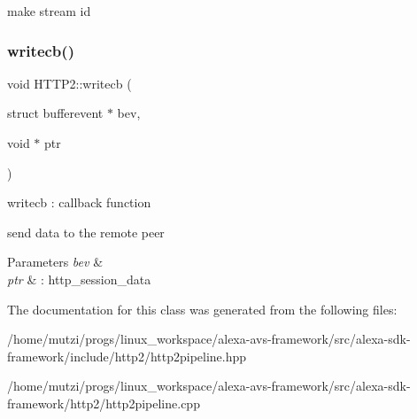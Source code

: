 make stream id \mbox{\label{classhttp2_1_1HTTP2_a5f9d1c3a2216305f7b13164e8f8f734c}} 
\subsubsection{\texorpdfstring{writecb()}{writecb()}}
{\footnotesize\ttfamily void H\+T\+T\+P2\+::writecb (\begin{DoxyParamCaption}\item[{struct bufferevent $\ast$}]{bev,  }\item[{void $\ast$}]{ptr }\end{DoxyParamCaption})\hspace{0.3cm}{\ttfamily [static]}}



writecb \+: callback function 

send data to the remote peer 
\begin{DoxyParams}{Parameters}
{\em bev} & \\
\hline
{\em ptr} & \+: http\+\_\+session\+\_\+data \\
\hline
\end{DoxyParams}


The documentation for this class was generated from the following files\+:\begin{DoxyCompactItemize}
\item 
/home/mutzi/progs/linux\+\_\+workspace/alexa-\/avs-\/framework/src/alexa-\/sdk-\/framework/include/http2/http2pipeline.\+hpp\item 
/home/mutzi/progs/linux\+\_\+workspace/alexa-\/avs-\/framework/src/alexa-\/sdk-\/framework/http2/http2pipeline.\+cpp\end{DoxyCompactItemize}
